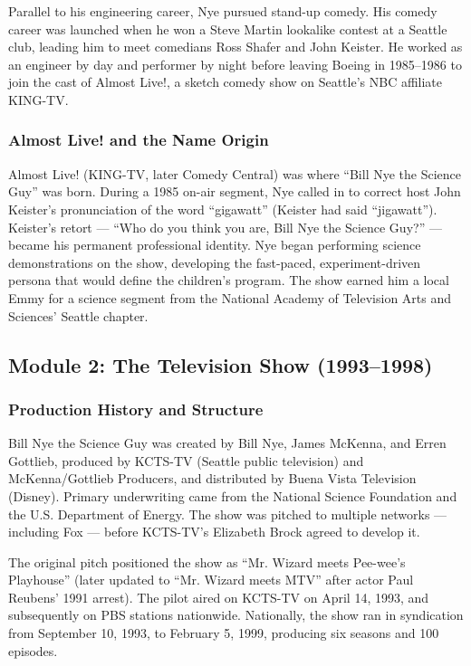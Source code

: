 \documentclass[11pt,letterpaper]{article}
\begin{document}
Parallel to his engineering career, Nye pursued stand-up comedy. His comedy career was launched when he won a Steve Martin lookalike contest at a Seattle club, leading him to meet comedians Ross Shafer and John Keister. He worked as an engineer by day and performer by night before leaving Boeing in 1985--1986 to join the cast of Almost Live!, a sketch comedy show on Seattle's NBC affiliate KING-TV.

\subsubsection{Almost Live! and the Name Origin}

Almost Live! (KING-TV, later Comedy Central) was where ``Bill Nye the Science Guy'' was born. During a 1985 on-air segment, Nye called in to correct host John Keister's pronunciation of the word ``gigawatt'' (Keister had said ``jigawatt''). Keister's retort --- ``Who do you think you are, Bill Nye the Science Guy?'' --- became his permanent professional identity. Nye began performing science demonstrations on the show, developing the fast-paced, experiment-driven persona that would define the children's program. The show earned him a local Emmy for a science segment from the National Academy of Television Arts and Sciences' Seattle chapter.

\subsection{Module 2: The Television Show (1993--1998)}

\subsubsection{Production History and Structure}

Bill Nye the Science Guy was created by Bill Nye, James McKenna, and Erren Gottlieb, produced by KCTS-TV (Seattle public television) and McKenna/Gottlieb Producers, and distributed by Buena Vista Television (Disney). Primary underwriting came from the National Science Foundation and the U.S. Department of Energy. The show was pitched to multiple networks --- including Fox --- before KCTS-TV's Elizabeth Brock agreed to develop it.

The original pitch positioned the show as ``Mr. Wizard meets Pee-wee's Playhouse'' (later updated to ``Mr. Wizard meets MTV'' after actor Paul Reubens' 1991 arrest). The pilot aired on KCTS-TV on April 14, 1993, and subsequently on PBS stations nationwide. Nationally, the show ran in syndication from September 10, 1993, to February 5, 1999, producing six seasons and 100 episodes.
\end{document}
